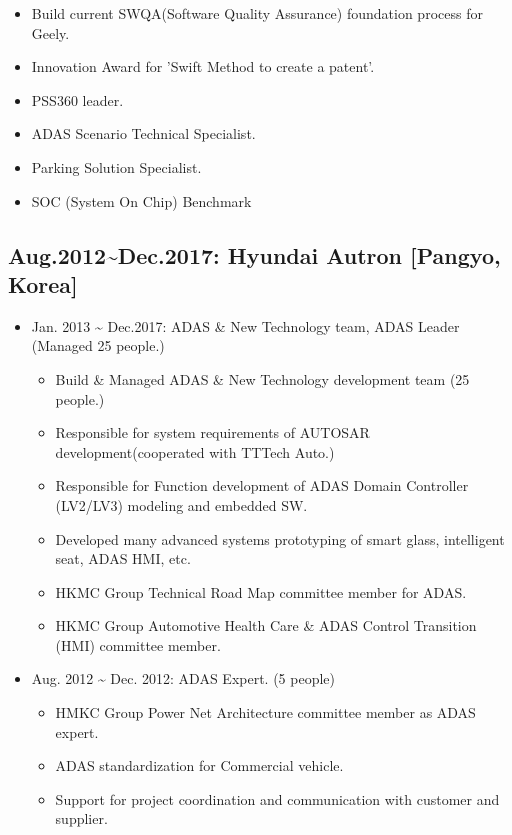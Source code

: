 \documentclass[12pt,a4paper]{article}
\begin{document}
\begin{itemize}
\begin{itemize}
\item Build current SWQA(Software Quality Assurance) foundation process for Geely.


\item Innovation Award for 'Swift Method to create a patent'.


\item PSS360 leader.


\item ADAS Scenario Technical Specialist.


\item Parking Solution Specialist.


\item SOC (System On Chip) Benchmark

\end{itemize}
\end{itemize}
\subsection{Aug.2012{\textasciitilde}Dec.2017: Hyundai Autron [Pangyo, Korea]}
\begin{itemize}
\item Jan. 2013 {\textasciitilde} Dec.2017: ADAS \& New Technology team, ADAS Leader (Managed 25 people.)

\begin{itemize}
\item Build \& Managed ADAS \& New Technology development team (25 people.)


\item Responsible for system requirements of AUTOSAR development(cooperated with TTTech Auto.)


\item Responsible for Function development of ADAS Domain Controller (LV2/LV3) modeling and embedded SW.


\item Developed many advanced systems prototyping of smart glass, intelligent seat, ADAS HMI, etc.


\item HKMC Group Technical Road Map committee member for ADAS.


\item HKMC Group Automotive Health Care \& ADAS Control Transition (HMI) committee member.

\end{itemize}

\item Aug. 2012 {\textasciitilde} Dec. 2012: ADAS Expert. (5 people)

\begin{itemize}
\item HMKC Group Power Net Architecture committee member as ADAS expert.


\item ADAS standardization for Commercial vehicle.


\item Support for project coordination and communication with customer and supplier.

\end{itemize}
\end{itemize}
\end{document}
